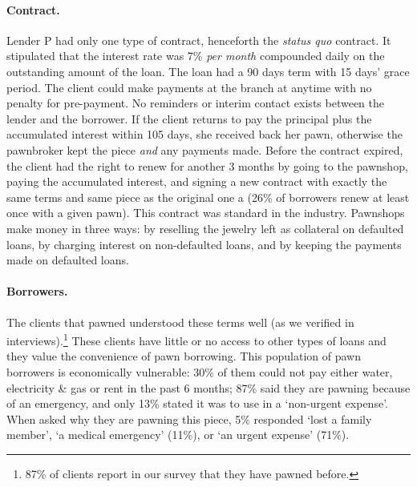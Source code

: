\documentclass[oneside,11pt]{article}
\begin{document}
\paragraph{Contract.} Lender P had only one type of contract, henceforth the \textit{status quo} contract. It stipulated that the interest rate was 7\% \textit{per month} compounded daily on the outstanding amount of the loan. The loan had a 90 days term with 15 days' grace period. The client could make payments at the branch at anytime with no penalty for pre-payment. No reminders or interim contact exists between the lender and the borrower. If the client returns to pay the principal plus the accumulated interest within 105 days, she received back her pawn, otherwise the pawnbroker kept the piece \textit{and} any payments made. Before the contract expired, the client had the right to renew for another 3 months by going to the pawnshop, paying the accumulated interest, and signing a new contract with exactly the same terms and same piece as the original one a (26\% of borrowers renew at least once with a given pawn). This contract was standard in the industry.  Pawnshops make money in three ways: by reselling the jewelry left as collateral on defaulted loans, by charging interest on non-defaulted loans, and by keeping the payments made on defaulted loans. 

\paragraph{Borrowers.} The clients that pawned understood these terms well (as we verified in interviews).\footnote{87\% of clients report in our survey that they have pawned before.} These clients have little or no access to other types of loans and they value the convenience of pawn borrowing.  This population of pawn borrowers is economically vulnerable:  30\% of them could not pay either water, electricity \& gas or rent in the past 6 months; 87\% said they are pawning because of an emergency, and only 13\% stated it was to use in a `non-urgent expense'.  When asked why they are pawning this piece, 5\% responded `lost a family member', `a medical emergency' (11\%), or `an urgent expense' (71\%).
\end{document}
